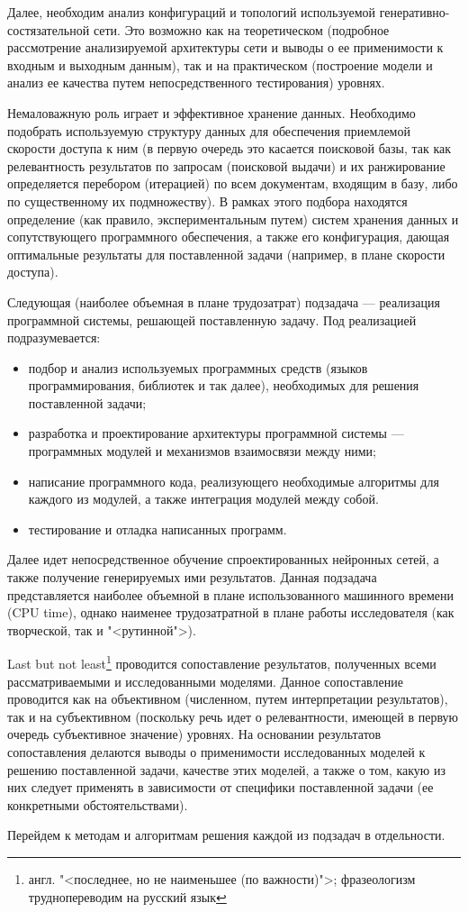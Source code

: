 Далее, необходим анализ конфигураций и топологий используемой генеративно-состязательной сети. Это возможно как на теоретическом
(подробное рассмотрение анализируемой архитектуры сети и выводы о ее применимости к входным и выходным данным), так и на практическом
(построение модели и анализ ее качества путем непосредственного тестирования) уровнях.

Немаловажную роль играет и эффективное хранение данных. Необходимо подобрать используемую структуру данных для обеспечения приемлемой
скорости доступа к ним (в первую очередь это касается поисковой базы, так как релевантность результатов по запросам (поисковой выдачи)
и их ранжирование определяется перебором (итерацией) по всем документам, входящим в базу, либо по существенному их подмножеству).
В рамках этого подбора находятся определение (как правило, экспериментальным путем) систем хранения данных и сопутствующего программного
обеспечения, а также его конфигурация, дающая оптимальные результаты для поставленной задачи (например, в плане скорости доступа).

Следующая (наиболее объемная в плане трудозатрат) подзадача --- реализация программной системы, решающей поставленную задачу. Под 
реализацией подразумевается:
\begin{itemize}
      \item подбор и анализ используемых программных средств (языков программирования, библиотек и так далее), 
            необходимых для решения поставленной задачи;
      \item разработка и проектирование архитектуры программной системы --- программных модулей и механизмов взаимосвязи между ними;
      \item написание программного кода, реализующего необходимые алгоритмы для каждого из модулей, а также интеграция модулей между собой.
      \item тестирование и отладка написанных программ.
\end{itemize}

Далее идет непосредственное обучение спроектированных нейронных сетей, а также получение генерируемых ими результатов. Данная подзадача
представляется наиболее объемной в плане использованного машинного времени (CPU time), однако наименее трудозатратной в плане
работы исследователя (как творческой, так и "<рутинной">).

Last but not least\footnote{англ. "<последнее, но не наименьшее (по важности)">; фразеологизм труднопереводим на русский язык}
проводится сопоставление результатов, полученных всеми рассматриваемыми и исследованными моделями. Данное сопоставление проводится
как на объективном (численном, путем интерпретации результатов), так и на субъективном (поскольку речь идет о релевантности,
имеющей в первую очередь субъективное значение) уровнях. На основании результатов сопоставления делаются выводы о применимости
исследованных моделей к решению поставленной задачи, качестве этих моделей, а также о том, какую из них следует применять в зависимости
от специфики поставленной задачи (ее конкретными обстоятельствами).

Перейдем к методам и алгоритмам решения каждой из подзадач в отдельности.